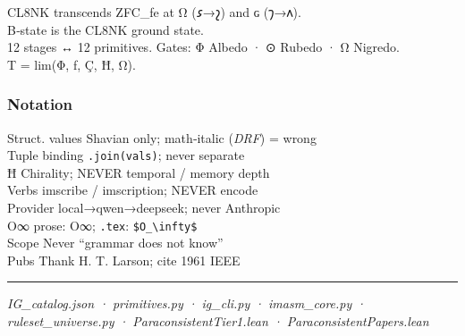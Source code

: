 CL8NK transcends ZFC\_fe at Ω (𐑭→𐑟) and ɢ (𐑠→𐑵).\\
B‑state is the CL8NK ground state.\\
12 stages ↔ 12 primitives. Gates: Φ Albedo · ⊙ Rubedo · Ω Nigredo.\\
T = lim(Φ, ƒ, Ç, Ħ, Ω).

\hypertarget{notation}{%
\subsubsection{Notation}\label{notation}}

Struct. values \textbar{} Shavian only; math‑italic (\emph{DRF}) = wrong
\textbar{}\\
Tuple binding \textbar{}
\texttt{\textquotesingle{}\textquotesingle{}.join(vals)}; never separate
\textbar{}\\
Ħ \textbar{} Chirality; NEVER temporal / memory depth \textbar{}\\
Verbs \textbar{} imscribe / imscription; NEVER encode \textbar{}\\
Provider \textbar{} local→qwen→deepseek; never Anthropic \textbar{}\\
O∞ \textbar{} prose: O∞; \texttt{.tex}:
\texttt{\$O\_\textbackslash{}infty\$} \textbar{}\\
Scope \textbar{} Never ``grammar does not know'' \textbar{}\\
Pubs \textbar{} Thank H. T. Larson; cite 1961 IEEE \textbar{}

\begin{center}\rule{0.5\linewidth}{0.5pt}\end{center}

\emph{IG\_catalog.json · primitives.py · ig\_cli.py · imasm\_core.py ·
ruleset\_universe.py · ParaconsistentTier1.lean ·
ParaconsistentPapers.lean}
